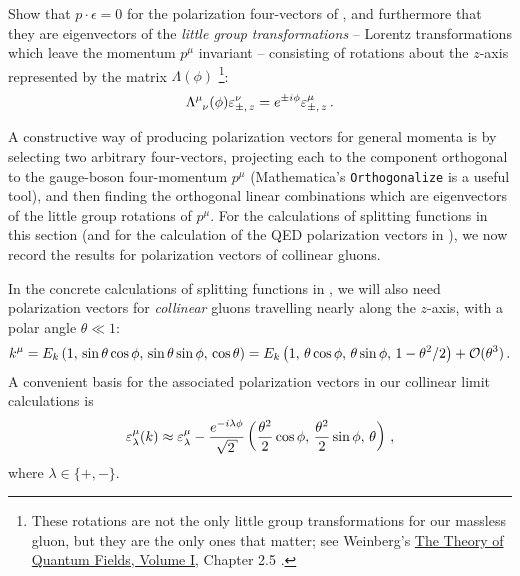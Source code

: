 \begin{subappendices}
\begin{exercise}
    Show that \(p\cdot \epsilon = 0\) for the polarization four-vectors of , and furthermore that they are eigenvectors of the \textit{little group transformations} -- Lorentz transformations which leave the momentum \(p^\mu\) invariant -- consisting of rotations about the \(z\)-axis represented by the matrix \(\Lambda(\phi)\)%
    \footnote{
        These rotations are not the only little group transformations for our massless gluon, but they are the only ones that matter;
        see Weinberg's \underline{The Theory of Quantum Fields, Volume I}, Chapter 2.5 \cite{Weinberg:1995mt}.
    }:
    \begin{align}
        \Lambda\indices{^\mu_\nu}(\phi) \varepsilon^\nu_{\pm,\,z}
        =
        e^{\pm i \phi} \varepsilon^\mu_{\pm,\,z}
        \,.
    \end{align}
\end{exercise}



A constructive way of producing polarization vectors for general momenta is by selecting two arbitrary four-vectors, projecting each to the component orthogonal to the gauge-boson four-momentum \(p^\mu\) (Mathematica's \texttt{Orthogonalize} is a useful tool), and then finding the orthogonal linear combinations which are eigenvectors of the little group rotations of \(p^\mu\).
%
For the calculations of splitting functions in this section (and for the calculation of the QED polarization vectors in ), we now record the results for polarization vectors of collinear gluons.

\begin{example}
In the concrete calculations of splitting functions in , we will also need polarization vectors for \textit{collinear} gluons travelling nearly along the \(z\)-axis, with a polar angle \(\theta \ll 1\):
\begin{align}
    k^\mu =
    E_k
    \left(1,\, \sin\theta\cos\phi,\, \sin\theta\sin\phi,\,\cos\theta\right)
    =
    E_k
    \left(1,\, \theta\cos\phi,\, \theta\sin\phi,\,1 - \theta^2/2\right)
    +
    \mathcal{O}(\theta^3)
    \,.
\end{align}
A convenient basis for the associated polarization vectors in our collinear limit calculations is
\begin{align}
    \label{eq:collinear-polarization}
    \varepsilon^\mu_\lambda(k)
    \approx
    \varepsilon^\mu_\lambda
    -
    \frac{e^{-i\lambda \phi}}{\sqrt{2}}
    \le(
    \frac{\theta^2}{2}\cos\phi,\,
    \frac{\theta^2}{2}\sin\phi,\,
    \theta
    \ri)
    \,,
\end{align}
where \(\lambda \in \{+,-\}\).
\end{example}


\end{subappendices}
